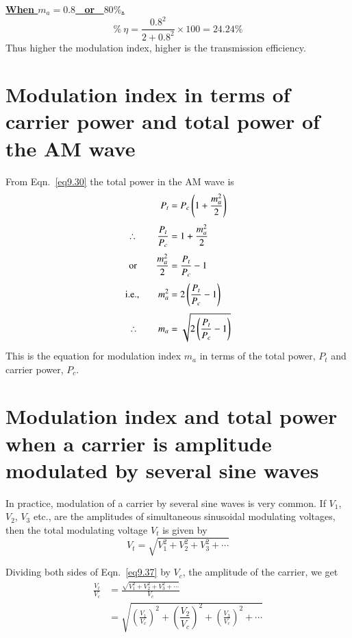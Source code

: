 \smallskip
\noindent
\underline{\bf When \boldmath$m_{a}=0.8$~ or~ $80\%$.}
$$
\% \ \eta =\dfrac{0.8^{2}}{2+0.8^{2}}\times 100 = 24.24\%
$$
Thus higher the modulation index, higher is the transmission efficiency.

\section{Modulation index in terms of carrier power and total power of the AM wave}\label{sec9.14}

From Eqn.~\eqref{eq9.30} the total power in the AM wave is
\begin{align}
P_{t} &= P_{c}\left(1+\dfrac{m^{2}_{a}}{2}\right)\notag\\[3pt]
\therefore\qquad \frac{P_{t}}{P_{c}} &= 1+\frac{m^{2}_{a}}{2}\notag\\[3pt]
\text{or}\qquad \frac{m^{2}_{a}}{2} &= \frac{P_{t}}{P_{c}}-1\notag\\[3pt]
\text{i.e.,}\qquad m^{2}_{a} &= 2\left(\dfrac{P_{t}}{P_{c}}-1\right)\notag\\[3pt]
\therefore\qquad m_{a} &= \sqrt{2\left(\dfrac{P_{t}}{P_{c}}-1\right)}\label{eq9.36} 
\end{align}
This is the equation for modulation index $m_{a}$ in terms of the total power, $P_{t}$ and carrier power, $P_{c}$.

\section{Modulation index and total power when a carrier is amplitude modulated by several sine waves}\label{sec9.15}

In practice, modulation of a carrier by several sine waves is very common. If $V_{1}$, $V_{2}$, $V_{3}$ etc., are the amplitudes of simultaneous sinusoidal modulating voltages, then the total modulating voltage $V_{t}$ is given by
\begin{equation}
V_{t}=\sqrt{V^{2}_{1}+V^{2}_{2}+V^{2}_{3}+\cdots}\label{eq9.37}
\end{equation}

Dividing both sides of Eqn.~\eqref{eq9.37} by $V_{c}$, the amplitude of the carrier, we get
\begin{align*}
\frac{V_{t}}{V_{c}} &= \frac{\sqrt{V^{2}_{1}+V^{2}_{2}+V^{2}_{3}+\cdots}}{V_{c}}\\[3pt]
&= \sqrt{\left(\frac{V_{1}}{V_{c}}\right)^{2}+\left(\dfrac{V_{2}}{V_{c}}\right)^{2}+\left(\frac{V_{3}}{V_{c}}\right)^{2}+\cdots}
\end{align*}

